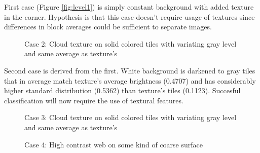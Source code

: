 \documentclass[11pt,twocolumn]{article}
\begin{document}
First case (Figure \ref{fig:level1}) is simply constant
background with added texture in the corner.
Hypothesis is that this case doesn't require usage of textures
since differences in block averages could be sufficient to
separate images.

\begin{figure}[htb]
\centering
\setlength\fboxsep{0pt}
\setlength\fboxrule{1pt}
\caption{Case 2: Cloud texture on solid colored tiles with variating gray level and same average as texture's}
\label{fig:level2}
\end{figure}

Second case is derived from the first.
White background is darkened to gray tiles that in average match texture's average
brightness (0.4707) and has considerably higher standard distribution (0.5362) than texture's
tiles (0.1123).
Succesful classification will now require the use of textural features.

\begin{figure}[htb]
\centering
\setlength\fboxsep{0pt}
\setlength\fboxrule{1pt}
\caption{Case 3: Cloud texture on solid colored tiles with variating gray level and same average as texture's}
\label{fig:level3}
\end{figure}

\begin{figure}[htb]
\centering
\setlength\fboxsep{0pt}
\setlength\fboxrule{1pt}
\caption{Case 4: High contrast web on some kind of coarse surface}
\label{fig:level4}
\end{figure}
\end{document}
